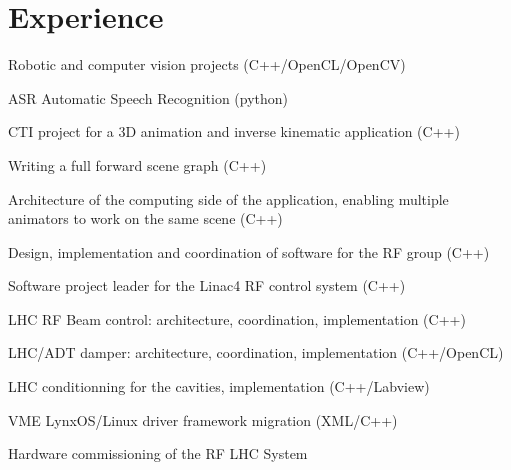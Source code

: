 \documentclass[a4paper]{deedy-resume} %
\begin{document}
\begin{minipage}[t]{0.66\textwidth} %


\section{Experience}


\vspace{\topsep} %
\begin{tightitemize}
\item Robotic and computer vision projects (C++/OpenCL/OpenCV)
\item ASR Automatic Speech Recognition (python)
\end{tightitemize}

\sectionspace %



\begin{tightitemize}
\item CTI project for a 3D animation and inverse kinematic application (C++)
\item Writing a full forward scene graph (C++)
\item Architecture of the computing side of the application, enabling multiple
    animators to work on the same scene (C++)
\end{tightitemize}

\sectionspace %



\begin{tightitemize}
\item Design, implementation and coordination of software for the RF group (C++)
\item Software project leader for the Linac4 RF control system (C++)
\item LHC RF Beam control: architecture, coordination, implementation (C++)
\item LHC/ADT damper: architecture, coordination, implementation (C++/OpenCL)
\item LHC conditionning for the cavities, implementation (C++/Labview)
\item VME LynxOS/Linux driver framework migration (XML/C++)
\item Hardware commissioning of the RF LHC System
\end{tightitemize}


\end{minipage}
\end{document}

